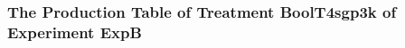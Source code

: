  \begin{frame}
 \fontsize{8pt}{9pt}\selectfont
 \frametitle{ The Production Table of Treatment BoolT4sgp3k of Experiment ExpB }

 \label{ExpBGrammarTable027.tex}  
 \end{frame}

